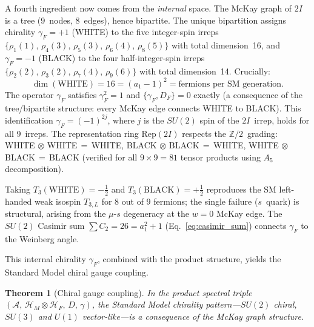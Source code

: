 \documentclass[12pt,a4paper]{article}
\newtheorem{theorem}{Theorem}
\theoremstyle{definition}
\begin{document}
A fourth ingredient now comes from the \emph{internal} space.  The McKay graph of $2I$ is a tree (9~nodes, 8~edges), hence bipartite.  The unique bipartition assigns chirality $\gamma_F = +1$ (WHITE) to the five integer-spin irreps $\{\rho_1(1),\, \rho_4(3),\, \rho_5(3),\, \rho_6(4),\, \rho_8(5)\}$ with total dimension~16, and $\gamma_F = -1$ (BLACK) to the four half-integer-spin irreps $\{\rho_2(2),\, \rho_3(2),\, \rho_7(4),\, \rho_9(6)\}$ with total dimension~14.  Crucially:
\begin{equation}
\dim(\text{WHITE}) = 16 = (a_1 - 1)^2 = \text{fermions per SM generation}.
\label{eq:white_dim}
\end{equation}
The operator $\gamma_F$ satisfies $\gamma_F^2 = 1$ and $\{\gamma_F, D_F\} = 0$ exactly (a consequence of the tree/bipartite structure: every McKay edge connects WHITE to BLACK).  This identification $\gamma_F = (-1)^{2j}$, where $j$ is the $SU(2)$ spin of the $2I$~irrep, holds for all 9~irreps.  The representation ring $\text{Rep}(2I)$ respects the $\mathbb{Z}/2$~grading: WHITE$\,\otimes\,$WHITE$\,=\,$WHITE, BLACK$\,\otimes\,$BLACK$\,=\,$WHITE, WHITE$\,\otimes\,$BLACK$\,=\,$BLACK (verified for all $9 \times 9 = 81$ tensor products using $A_5$ decomposition).

Taking $T_3(\text{WHITE}) = -\tfrac{1}{2}$ and $T_3(\text{BLACK}) = +\tfrac{1}{2}$ reproduces the SM left-handed weak isospin $T_{3,L}$ for 8 out of 9 fermions; the single failure ($s$~quark) is structural, arising from the $\mu$-$s$ degeneracy at the $w = 0$ McKay edge.  The $SU(2)$ Casimir sum $\sum C_2 = 26 = a_1^2 + 1$ (Eq.~\ref{eq:casimir_sum}) connects $\gamma_F$ to the Weinberg angle.

This internal chirality $\gamma_F$, combined with the product structure, yields the Standard Model chiral gauge coupling.

\begin{theorem}[Chiral gauge coupling]\label{thm:chiral_gauge}
In the product spectral triple $(\mathcal{A},\, \mathcal{H}_M \otimes \mathcal{H}_F,\, D,\, \gamma)$, the Standard Model chirality pattern---$SU(2)$ chiral, $SU(3)$ and $U(1)$ vector-like---is a consequence of the McKay graph structure.
\end{theorem}
\end{document}
